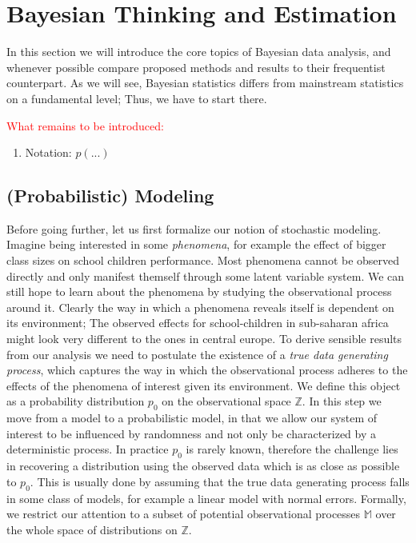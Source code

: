 \section{Bayesian Thinking and Estimation}
In this section we will introduce the core topics of Bayesian data analysis, and whenever possible compare proposed methods and results to their frequentist counterpart.
As we will see, Bayesian statistics differs from mainstream statistics on a fundamental level; Thus, we have to start there.

\textcolor{red}{What remains to be introduced:}
\begin{enumerate}
  \item Notation: $p(...)$
\end{enumerate}

\subsection{(Probabilistic) Modeling}
Before going further, let us first formalize our notion of stochastic modeling.
Imagine being interested in some \textit{phenomena}, for example the effect of bigger class sizes on school children performance.
Most phenomena cannot be observed directly and only manifest themself through some latent variable system.
We can still hope to learn about the phenomena by studying the observational process around it.
Clearly the way in which a phenomena reveals itself is dependent on its environment;
The observed effects for school-children in sub-saharan africa might look very different to the ones in central europe.
To derive sensible results from our analysis we need to postulate the existence of a \textit{true data generating process}, which captures the way in which the observational process adheres to the effects of the phenomena of interest given its environment.
We define this object as a probability distribution $p_0$ on the observational space $\mathbb{Z}$.
In this step we move from a model to a probabilistic model, in that we allow our system of interest to be influenced by randomness and not only be characterized by a deterministic process.
In practice $p_0$ is rarely known, therefore the challenge lies in recovering a distribution using the observed data which is as close as possible to $p_0$.
This is usually done by assuming that the true data generating process falls in some class of models, for example a linear model with normal errors.
Formally, we restrict our attention to a subset of potential observational processes $\mathbb{M}$ over the whole space of distributions on $\mathbb{Z}$.
